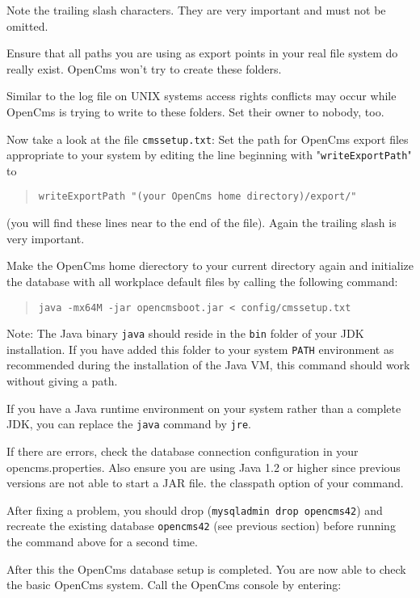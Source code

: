 Note the trailing slash
characters. They are very important and must not be omitted.

Ensure that all paths you are using as export points in your real file system
do really exist. OpenCms won't try to create these folders.

Similar to the log file on UNIX systems access rights conflicts may occur while
OpenCms is trying to write to these folders. Set their owner to nobody, too.

Now take a look at the file \texttt{cmssetup.txt}:
Set the path for OpenCms export files appropriate to your system by editing
the line beginning with "\texttt{writeExportPath}" to 

\begin{quote}
\texttt{writeExportPath "(your OpenCms home directory)/export/"}
\end{quote}

(you will find these lines near to the end of the file).
Again the trailing slash is very important. 

Make the OpenCms home dierectory to your current directory again and
initialize the database with all workplace default files by calling the following command:

\begin{quote}
\texttt{java -mx64M -jar opencmsboot.jar < config/cmssetup.txt}
\end{quote}

Note: The Java binary \texttt{java} should 
reside in the \texttt{bin} folder of your JDK installation. If you have added this folder to your 
system \texttt{PATH} environment as recommended during the installation of the Java VM,
this command should work without giving a path.

If you have a Java runtime environment 
on your system rather than a complete JDK, you
can replace the \texttt{java} command by \texttt{jre}.

If there are errors, check the database connection configuration in your
opencms.properties. Also ensure you are using Java 1.2 or higher since
previous versions are not able to start a JAR file.
the classpath option of your command.

After fixing a problem, you should drop (\texttt{mysqladmin drop opencms42}) and recreate 
the existing database \texttt{opencms42} (see previous section) before 
running the command above for a second time.

After this the OpenCms database setup is completed. You are now able to check the basic OpenCms system. 
Call the OpenCms console by entering:

